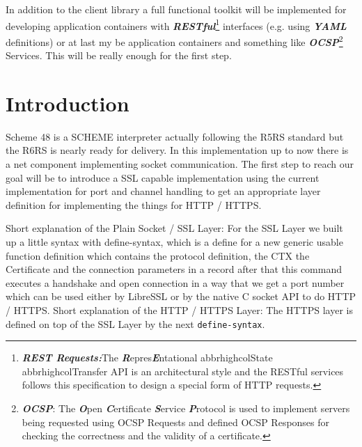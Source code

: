 \documentclass[10pt,a4paper,english]{article}
\newcommand{\code}[1]{{\tt{#1}}}
\newcommand{\abbrhighcol}[1]{\textbf{\textit{#1}}}
\begin{document}
\begin{multicols}{2}
\begin{flushleft}
In addition to the client library a full  functional toolkit will be implemented for developing application containers with \abbrhighcol {RESTful}\footnote{\abbrhighcol {REST Requests:}The \abbrhighcol {R}epres\abbrhighcol  {E}ntational abbrhighcol{S}tate abbrhighcol{T}ransfer API is an architectural style and the RESTful services follows this specification to design a special form of HTTP requests.} interfaces (e.g. using \abbrhighcol {YAML} definitions) or at last my be application containers and something like \abbrhighcol {OCSP}\footnote{ \abbrhighcol {OCSP}: The \abbrhighcol  {O}pen \abbrhighcol {C}ertificate \abbrhighcol  {S}ervice \abbrhighcol  {P}rotocol is used to implement servers being requested using OCSP Requests and defined OCSP  Responses for checking the correctness and the validity of a certificate.} Services.
This will be really enough for the first step.
\end{flushleft}

\section{Introduction}

\begin{flushleft}
Scheme 48 is a SCHEME interpreter actually following the R5RS standard but the R6RS is nearly ready for delivery. In this implementation up to now there is a net component implementing socket communication.
The first step to reach our goal will be to introduce a SSL capable implementation using the current implementation for port and channel handling to get an appropriate layer definition for  implementing the things for HTTP / HTTPS.
\end{flushleft}
\begin{flushleft}
Short explanation of the Plain Socket / SSL Layer:
For the SSL Layer we built up a little syntax with define-syntax,  which is a define for a new generic usable function definition which contains the protocol definition, the CTX the Certificate and the connection parameters in a record after that this command executes a handshake and  open connection in a way that we  get a port number which can be used either by LibreSSL or by the native C socket API to do HTTP / HTTPS.
Short explanation of the HTTP / HTTPS Layer:
The HTTPS layer  is defined on top of the SSL Layer by the  next \code{define-syntax}.
\end{flushleft}


\end{multicols}
\end{document}
